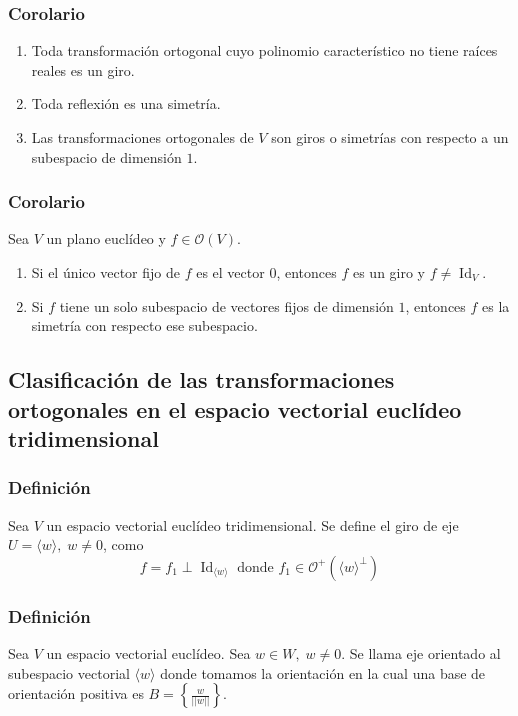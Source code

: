 \documentclass[12pt, a4paper, ones, notitlepage, openany,titlepage]{article}
\begin{document}
\subsubsection{Corolario}
\begin{enumerate}[label=(\arabic*)]
	\item Toda transformación ortogonal cuyo polinomio característico  no tiene raíces reales es un giro.
	\item Toda reflexión es una simetría.
	\item Las transformaciones ortogonales de $V$ son giros o simetrías con respecto a un subespacio de dimensión $1$.
\end{enumerate}

\subsubsection{Corolario}
Sea $V$ un plano euclídeo y $f \in \mathcal{O}(V)$.
\begin{enumerate}[label=(\arabic*)]
	\item Si el único vector fijo de $f$ es el vector $0$, entonces $f$ es un giro y $f \neq \operatorname{Id}_V$.
	\item Si $f$ tiene un solo subespacio de vectores fijos de dimensión $1$, entonces $f$ es la simetría con respecto ese subespacio.
\end{enumerate}

\subsection{Clasificación de las transformaciones ortogonales en el espacio vectorial euclídeo tridimensional}

\subsubsection{Definición}
Sea $V$ un espacio vectorial euclídeo tridimensional. Se define el giro de eje $U = \langle w \rangle, \; w \neq 0$, como
$$
f = f_1 \perp \operatorname{Id}_{\langle w \rangle} \text{ donde } f_1 \in \mathcal{O}^+(\langle w \rangle^\perp)
$$

\subsubsection{Definición}
Sea $V$ un espacio vectorial euclídeo. Sea $w \in W, \; w \neq 0$. Se llama eje orientado al subespacio vectorial $\langle w \rangle$ donde tomamos la orientación en la cual una base de orientación positiva es $\displaystyle B = \left\{ \frac{w}{||w||} \right\}$.
\end{document}
